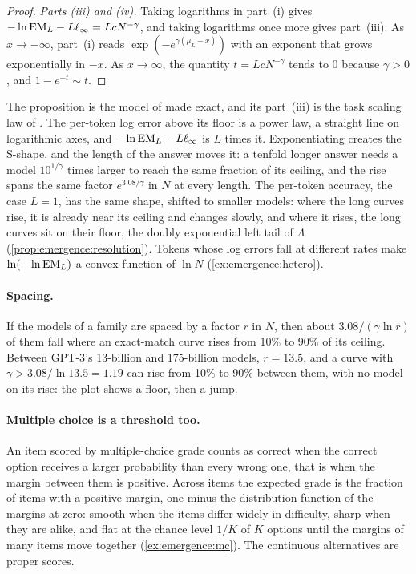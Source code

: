 \begin{refsection}
\begin{proof}
\emph{Parts (iii) and (iv).} Taking logarithms in part~(i) gives $-\ln\mathrm{EM}_L-L\ell_\infty=LcN^{-\gamma}$, and taking logarithms once more gives part~(iii). As $x\to-\infty$, part~(i) reads $\exp(-e^{\gamma(\mu_L-x)})$ with an exponent that grows exponentially in $-x$. As $x\to\infty$, the quantity $t=LcN^{-\gamma}$ tends to $0$ because $\gamma>0$, and $1-e^{-t}\sim t$.
\end{proof}

The proposition is the model of \textcite{SchaefferMirandaKoyejo2023} made exact, and its part~(iii) is the task scaling law of \textcite{HuEtAl2024}. The per-token log error above its floor is a power law, a straight line on logarithmic axes, and $-\ln\mathrm{EM}_L-L\ell_\infty$ is $L$ times it. Exponentiating creates the S-shape, and the length of the answer moves it: a tenfold longer answer needs a model $10^{1/\gamma}$ times larger to reach the same fraction of its ceiling, and the rise spans the same factor $e^{3.08/\gamma}$ in $N$ at every length. The per-token accuracy, the case $L=1$, has the same shape, shifted to smaller models: where the long curves rise, it is already near its ceiling and changes slowly, and where it rises, the long curves sit on their floor, the doubly exponential left tail of $\Lambda$ (\cref{prop:emergence:resolution}). Tokens whose log errors fall at different rates make $\ln(-\ln\mathrm{EM}_L)$ a convex function of $\ln N$ (\cref{ex:emergence:hetero}).

\paragraph{Spacing.} If the models of a family are spaced by a factor $r$ in $N$, then about $3.08/(\gamma\ln r)$ of them fall where an exact-match curve rises from 10\% to 90\% of its ceiling. Between GPT-3's 13-billion and 175-billion models, $r=13.5$, and a curve with $\gamma>3.08/\ln13.5=1.19$ can rise from 10\% to 90\% between them, with no model on its rise: the plot shows a floor, then a jump.

\paragraph{Multiple choice is a threshold too.} An item scored by multiple-choice grade counts as correct when the correct option receives a larger probability than every wrong one, that is when the margin between them is positive. Across items the expected grade is the fraction of items with a positive margin, one minus the distribution function of the margins at zero: smooth when the items differ widely in difficulty, sharp when they are alike, and flat at the chance level $1/K$ of $K$ options until the margins of many items move together (\cref{ex:emergence:mc}). The continuous alternatives are proper scores.


\end{refsection}
